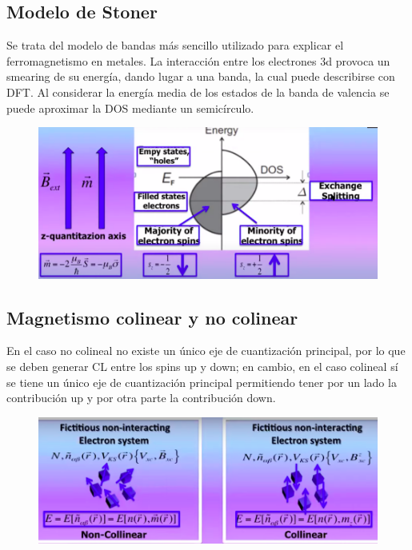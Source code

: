 \subsection{Modelo de Stoner}

  Se trata del modelo de bandas más sencillo utilizado para explicar el ferromagnetismo en metales. La interacción entre los electrones 3d provoca un smearing de su energía, dando lugar a una banda, la cual puede describirse con DFT. Al considerar la energía media de los estados de la banda de valencia se puede aproximar la DOS mediante un semicírculo.

    \begin{figure}[H]
        \centering
        \includegraphics[scale = 0.5]{figs/D7/stoner.png}
    \end{figure}

\subsection{Magnetismo colinear y no colinear}

  En el caso no colineal no existe un único eje de cuantización principal, por lo que se deben generar CL entre los spins up y down; en cambio, en el caso colineal sí se tiene un único eje de cuantización principal permitiendo tener por un lado la contribución up y por otra parte la contribución down.

  \begin{figure}[H]
      \centering
      \includegraphics[scale = 0.5]{figs/D7/colin.png}
  \end{figure}

